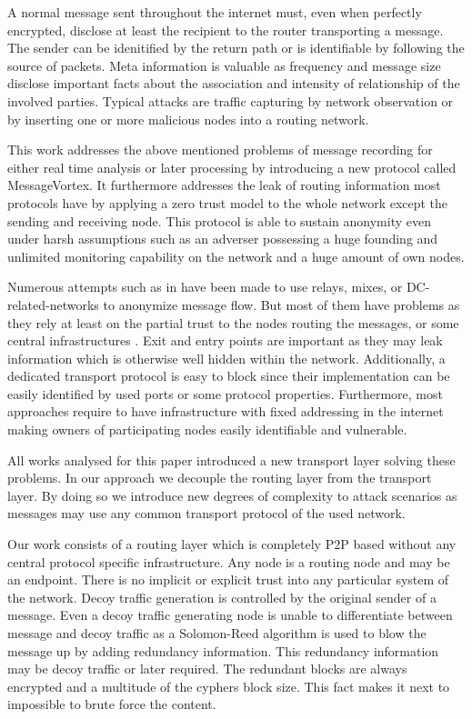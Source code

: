 \documentclass[9pt,journal,compsoc]{IEEEtran}
\begin{document}
A normal message sent throughout the internet must, even when perfectly encrypted, disclose at least the recipient to the router transporting a message. The sender can be idenitified by the return path or is identifiable by following the source of packets. Meta information is valuable as frequency and message size disclose important facts about the association and intensity of relationship of the involved parties. Typical attacks are traffic capturing by network observation or by inserting one or more malicious nodes into a routing network. 

This work addresses the above mentioned problems of message recording for either real time analysis or later processing by introducing a new  protocol called MessageVortex. It furthermore addresses the leak of routing information most protocols have by applying a zero trust model to the whole network except the sending and receiving node. This protocol is able to sustain anonymity even under harsh assumptions such as an adverser possessing a huge founding and unlimited monitoring capability on the network and a huge amount of own nodes. 

Numerous attempts such as in \cite{minion-design,babel,mixmaster-spec,tor-design,freehaven-berk,herbivore:tr} have been made to use relays\cite{CHAUM1}, mixes\cite{CHAUM1}, or DC-related-networks\cite{chaum-dc} to anonymize message flow. But most of them have problems as they rely at least on the partial trust to the nodes routing the messages, or some central infrastructures \cite{hs-attack06,esorics13-cellflood,esorics12-torscan,oakland2013-trawling}. Exit and entry points are important as they may leak information which is otherwise well hidden within the network. Additionally, a dedicated transport protocol is easy to block since their implementation can be easily identified by used ports or some protocol properties. Furthermore, most approaches require to have infrastructure with fixed addressing in the internet making owners of participating nodes easily identifiable and vulnerable.

All works analysed for this paper introduced a new transport layer solving these problems. In our approach we decouple the routing layer from the transport layer. By doing so we introduce new degrees of complexity to attack scenarios as messages may use any common transport protocol of the used network. 

Our work consists of a routing layer which is completely P2P based without any central protocol specific infrastructure. Any node is a routing node and may be an endpoint. There is no implicit or explicit trust into any particular system of the  network. Decoy traffic generation is controlled by the original sender of a message. Even a decoy traffic generating node is unable to differentiate between message and decoy traffic as a Solomon-Reed algorithm is used to blow the message up by adding redundancy information. This redundancy information may be decoy traffic or later required. The redundant blocks are always encrypted and a multitude of the cyphers block size. This fact makes it next to impossible to brute force the content.
\end{document}

